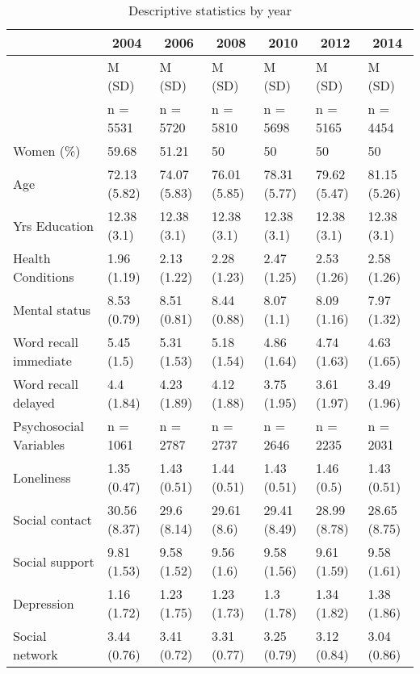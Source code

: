 \documentclass[english,man]{apa6}
\theoremstyle{definition}
\theoremstyle{definition}
\theoremstyle{remark}
\begin{document}
\begin{table}[tbp]
\begin{center}
\begin{threeparttable}
\caption{\label{tab:descriptive-statistics}Descriptive statistics by year}
\begin{tabular}{lllllll}
\toprule
 & \multicolumn{1}{c}{2004} & \multicolumn{1}{c}{2006} & \multicolumn{1}{c}{2008} & \multicolumn{1}{c}{2010} & \multicolumn{1}{c}{2012} & \multicolumn{1}{c}{2014}\\
\midrule
 & M (SD) & M (SD) & M (SD) & M (SD) & M (SD) & M (SD)\\
 & n = 5531 & n = 5720 & n = 5810 & n = 5698 & n = 5165 & n = 4454\\
Women (\%) & 59.68 & 51.21 & 50 & 50 & 50 & 50\\
Age & 72.13 (5.82) & 74.07 (5.83) & 76.01 (5.85) & 78.31 (5.77) & 79.62 (5.47) & 81.15 (5.26)\\
Yrs Education & 12.38 (3.1) & 12.38 (3.1) & 12.38 (3.1) & 12.38 (3.1) & 12.38 (3.1) & 12.38 (3.1)\\
Health Conditions & 1.96 (1.19) & 2.13 (1.22) & 2.28 (1.23) & 2.47 (1.25) & 2.53 (1.26) & 2.58 (1.26)\\
Mental status & 8.53 (0.79) & 8.51 (0.81) & 8.44 (0.88) & 8.07 (1.1) & 8.09 (1.16) & 7.97 (1.32)\\
Word recall immediate & 5.45 (1.5) & 5.31 (1.53) & 5.18 (1.54) & 4.86 (1.64) & 4.74 (1.63) & 4.63 (1.65)\\
Word recall delayed & 4.4 (1.84) & 4.23 (1.89) & 4.12 (1.88) & 3.75 (1.95) & 3.61 (1.97) & 3.49 (1.96)\\
Psychosocial Variables & n = 1061 & n = 2787 & n = 2737 & n = 2646 & n = 2235 & n = 2031\\
Loneliness & 1.35 (0.47) & 1.43 (0.51) & 1.44 (0.51) & 1.43 (0.51) & 1.46 (0.5) & 1.43 (0.51)\\
Social contact & 30.56 (8.37) & 29.6 (8.14) & 29.61 (8.6) & 29.41 (8.49) & 28.99 (8.78) & 28.65 (8.75)\\
Social support & 9.81 (1.53) & 9.58 (1.52) & 9.56 (1.6) & 9.58 (1.56) & 9.61 (1.59) & 9.58 (1.61)\\
Depression & 1.16 (1.72) & 1.23 (1.75) & 1.23 (1.73) & 1.3 (1.78) & 1.34 (1.82) & 1.38 (1.86)\\
Social network & 3.44 (0.76) & 3.41 (0.72) & 3.31 (0.77) & 3.25 (0.79) & 3.12 (0.84) & 3.04 (0.86)\\
\bottomrule
\end{tabular}
\end{threeparttable}
\end{center}
\end{table}
\end{document}
